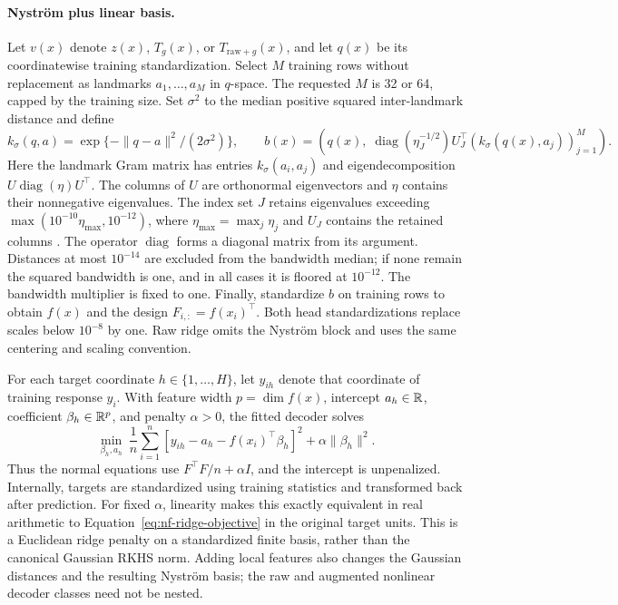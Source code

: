 \paragraph{Nystr\"om plus linear basis.}
\label{sec:nf-head}
Let $v(x)$ denote $z(x)$, $T_g(x)$, or $T_{\mathrm{raw}+g}(x)$, and let
$q(x)$ be its coordinatewise training standardization.  Select $M$ training
rows without replacement as landmarks $a_1,\ldots,a_M$ in $q$-space.
The requested $M$ is 32 or 64, capped by the training size.
Set $\sigma^2$ to the median positive squared inter-landmark distance and
define
\begin{equation}
 k_\sigma(q,a)=\exp\{-\|q-a\|^2/(2\sigma^2)\},\qquad
 b(x)=\left(q(x),\;
       \operatorname{diag}(\eta_J^{-1/2})U_J^\top
                  (k_\sigma(q(x),a_j))_{j=1}^M\right).
 \label{eq:nf-nystrom}
\end{equation}
Here the landmark Gram matrix has entries $k_\sigma(a_i,a_j)$ and
eigendecomposition $U\operatorname{diag}(\eta)U^\top$. The columns
of $U$ are orthonormal eigenvectors and $\eta$ contains their
nonnegative eigenvalues. The index set $J$ retains eigenvalues exceeding
$\max(10^{-10}\eta_{\max},10^{-12})$, where
$\eta_{\max}=\max_j\eta_j$ and $U_J$ contains the retained columns
\citep{Williams2001Nystrom}. The operator $\operatorname{diag}$ forms
a diagonal matrix from its argument.
Distances at most $10^{-14}$ are excluded from the bandwidth median;
if none remain the squared bandwidth is one, and in all cases it is floored
at $10^{-12}$.  The bandwidth multiplier is fixed to one.
Finally, standardize $b$ on training rows to obtain $f(x)$ and the design
$F_{i,:}=f(x_i)^\top$.  Both head standardizations replace scales below
$10^{-8}$ by one.  Raw ridge omits the Nystr\"om block and uses the same
centering and scaling convention.

For each target coordinate $h\in\{1,\ldots,H\}$, let $y_{ih}$
denote that coordinate of training response $y_i$. With feature width
$p=\dim f(x)$, intercept $a_h\in\mathbb{R}$, coefficient
$\beta_h\in\mathbb{R}^p$, and penalty $\alpha>0$, the fitted decoder solves
\begin{equation}
 \min_{\beta_h,a_h}\ \frac1n\sum_{i=1}^n
       [y_{ih}-a_h-f(x_i)^\top\beta_h]^2+\alpha\|\beta_h\|^2.
 \label{eq:nf-ridge-objective}
\end{equation}
Thus the normal equations use $F^\top F/n+\alpha I$, and the intercept is
unpenalized.  Internally, targets are standardized using training statistics
and transformed back after prediction.  For fixed $\alpha$, linearity makes
this exactly equivalent in real arithmetic to
Equation~\eqref{eq:nf-ridge-objective} in the original target units.
This is a Euclidean ridge penalty on a standardized finite basis, rather
than the canonical Gaussian RKHS norm.  Adding local features also changes
the Gaussian distances and the resulting Nystr\"om basis; the raw and
augmented nonlinear decoder classes need not be nested.

